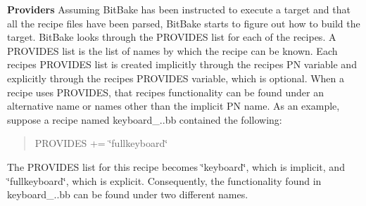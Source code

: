 \begin{DoxyItemize}
\item {\bfseries Providers} Assuming Bit\+Bake has been instructed to execute a target and that all the recipe files have been parsed, Bit\+Bake starts to figure out how to build the target. Bit\+Bake looks through the P\+R\+O\+V\+I\+D\+ES list for each of the recipes. A P\+R\+O\+V\+I\+D\+ES list is the list of names by which the recipe can be known. Each recipe\textquotesingle{}s P\+R\+O\+V\+I\+D\+ES list is created implicitly through the recipe\textquotesingle{}s PN variable and explicitly through the recipe\textquotesingle{}s P\+R\+O\+V\+I\+D\+ES variable, which is optional. When a recipe uses P\+R\+O\+V\+I\+D\+ES, that recipe\textquotesingle{}s functionality can be found under an alternative name or names other than the implicit PN name. As an example, suppose a recipe named keyboard\+\_..\+bb contained the following\+:
\end{DoxyItemize}

\begin{quote}
P\+R\+O\+V\+I\+D\+ES += \char`\"{}fullkeyboard\char`\"{} \end{quote}
The P\+R\+O\+V\+I\+D\+ES list for this recipe becomes \char`\"{}keyboard\char`\"{}, which is implicit, and \char`\"{}fullkeyboard\char`\"{}, which is explicit. Consequently, the functionality found in keyboard\+\_..\+bb can be found under two different names. ~\newline

